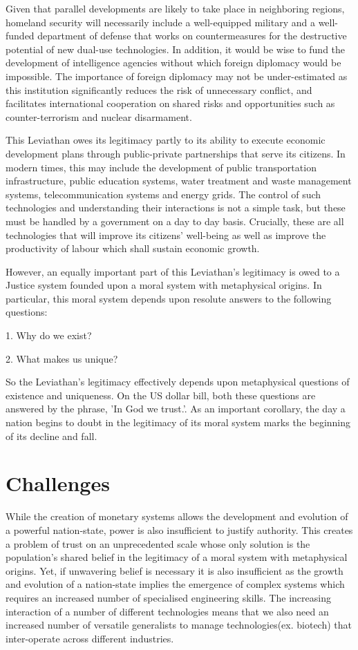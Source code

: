 \documentclass{article}
\begin{document}
Given that parallel developments are likely to take place in neighboring regions, homeland
security will necessarily include a well-equipped military and a well-funded department of
defense that works on countermeasures for the destructive potential of new dual-use technologies.
In addition, it would be wise to fund the development of intelligence agencies without which
foreign diplomacy would be impossible. The importance of foreign diplomacy may not be under-estimated as this institution significantly reduces the risk of unnecessary conflict, and
facilitates international cooperation on shared risks and opportunities such as
counter-terrorism and nuclear disarmament.

This Leviathan owes its legitimacy partly to its ability to execute economic development plans
through public-private partnerships that serve its citizens. In modern times, this may include
the development of public transportation infrastructure, public education systems, water
treatment and waste management systems, telecommunication systems and energy grids. The
control of such technologies and understanding their interactions is not a simple task, but
these must be handled by a government on a day to day basis. Crucially, these are all
technologies that will improve its citizens' well-being as well as improve the productivity of
labour which shall sustain economic growth.

However, an equally important part of this Leviathan's legitimacy is owed to a Justice
system founded upon a moral system with metaphysical origins. In particular, this moral
system depends upon resolute answers to the following questions:

1.  Why do we exist?

2. What makes us unique?

So the Leviathan's legitimacy effectively depends upon metaphysical questions of existence
and uniqueness. On the US dollar bill, both these questions are answered by the phrase, 'In God we trust.'. As an important corollary, the day a nation begins to doubt in the legitimacy of its moral system
marks the beginning of its decline and fall.


\section{Challenges}
While the creation of monetary systems allows the development and evolution of a powerful
nation-state, power is also insufficient to justify authority. This creates a problem of trust on an unprecedented scale whose only solution is the population's shared belief in the legitimacy of a moral system with metaphysical origins. Yet, if unwavering belief is necessary it is also insufficient as the growth and evolution
of a nation-state implies the emergence of complex systems which requires an increased number
of specialised engineering skills. The increasing interaction of a number of different technologies means that we also need an increased
number of versatile generalists to manage technologies(ex. biotech) that inter-operate across different industries. 
\end{document}
